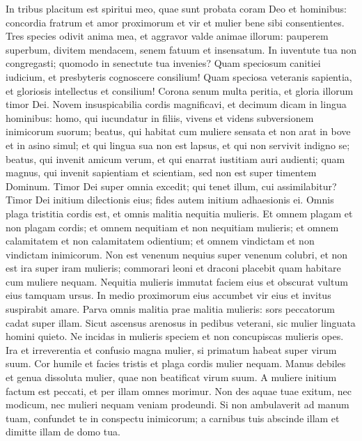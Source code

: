 \begin{biblechapter}  
\verse In tribus placitum est spiritui meo, quae sunt probata coram Deo et hominibus: 
\verse concordia fratrum et amor proximorum et vir et mulier bene sibi consentientes. 
\verse Tres species odivit anima mea, et aggravor valde animae illorum: 
\verse pauperem superbum, divitem mendacem, senem fatuum et insensatum. 
\verse In iuventute tua non congregasti; quomodo in senectute tua invenies? 
\verse Quam speciosum canitiei iudicium, et presbyteris cognoscere consilium! 
\verse Quam speciosa veteranis sapientia, et gloriosis intellectus et consilium! 
\verse Corona senum multa peritia, et gloria illorum timor Dei. 
\verse Novem insuspicabilia cordis magnificavi, et decimum dicam in lingua hominibus: 
\verse homo, qui iucundatur in filiis, vivens et videns subversionem inimicorum suorum; 
\verse beatus, qui habitat cum muliere sensata et non arat in bove et in asino simul; et qui lingua sua non est lapsus, et qui non servivit indigno se; 
\verse beatus, qui invenit amicum verum, et qui enarrat iustitiam auri audienti; 
\verse quam magnus, qui invenit sapientiam et scientiam, sed non est super timentem Dominum. 
\verse Timor Dei super omnia excedit; 
\verse qui tenet illum, cui assimilabitur? 
\verse Timor Dei initium dilectionis eius; fides autem initium adhaesionis ei. 
\verse Omnis plaga tristitia cordis est, et omnis malitia nequitia mulieris. 
\verse Et omnem plagam et non plagam cordis; 
\verse et omnem nequitiam et non nequitiam mulieris; 
\verse et omnem calamitatem et non calamitatem odientium; 
\verse et omnem vindictam et non vindictam inimicorum. 
\verse Non est venenum nequius super venenum colubri, 
\verse et non est ira super iram mulieris; commorari leoni et draconi placebit quam habitare cum muliere nequam. 
\verse Nequitia mulieris immutat faciem eius et obscurat vultum eius tamquam ursus. In medio proximorum eius accumbet vir eius 
\verse et invitus suspirabit amare. 
\verse Parva omnis malitia prae malitia mulieris: sors peccatorum cadat super illam. 
\verse Sicut ascensus arenosus in pedibus veterani, sic mulier linguata homini quieto. 
\verse Ne incidas in mulieris speciem et non concupiscas mulieris opes. 
\verse Ira et irreverentia et confusio magna 
\verse mulier, si primatum habeat super virum suum. 
\verse Cor humile et facies tristis et plaga cordis mulier nequam. 
\verse Manus debiles et genua dissoluta mulier, quae non beatificat virum suum. 
\verse A muliere initium factum est peccati, et per illam omnes morimur. 
\verse Non des aquae tuae exitum, nec modicum, nec mulieri nequam veniam prodeundi. 
\verse Si non ambulaverit ad manum tuam, confundet te in conspectu inimicorum; 
\verse a carnibus tuis abscinde illam et dimitte illam de domo tua. 
\end{biblechapter}

